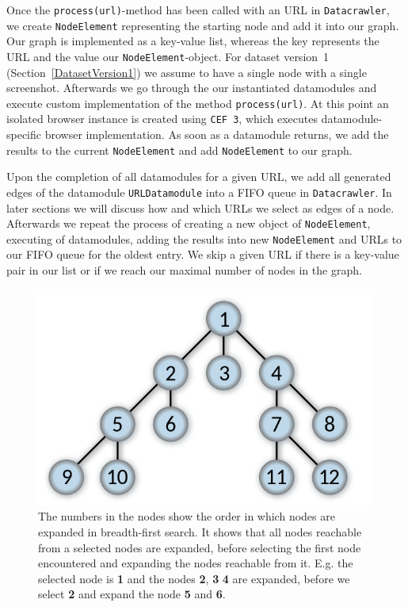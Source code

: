 Once the \texttt{process(url)}-method has been called with an URL in \texttt{Datacrawler}, we create \texttt{NodeElement} representing the starting node and add it into our graph. Our graph is implemented as a key-value list, whereas the key represents the URL and the value our \texttt{NodeElement}-object. For dataset version~1 (Section~\ref{DatasetVersion1}) we assume to have a single node with a single screenshot. Afterwards we go through the our instantiated datamodules and execute custom implementation of the method \texttt{process(url)}. At this point an isolated browser instance is created using \texttt{CEF 3}, which executes datamodule-specific browser implementation. As soon as a datamodule returns, we add the results to the current \texttt{NodeElement} and add \texttt{NodeElement} to our graph. 

Upon the completion of all datamodules for a given URL, we add all generated edges of the datamodule \texttt{URLDatamodule} into a FIFO queue in \texttt{Datacrawler}. In later sections we will discuss how and which URLs we select as edges of a node. Afterwards we repeat the process of creating a new object of \texttt{NodeElement}, executing of datamodules, adding the results into new \texttt{NodeElement} and URLs to our FIFO queue for the oldest entry. We skip a given URL if there is a key-value pair in our list or if we reach our maximal number of nodes in the graph.

\begin{figure}
	\centering
	\includegraphics[scale=0.35]{resources/breadth-first}
	\caption[Illustration of the breadth-first search algorithm]{ The numbers in the nodes show the order in which nodes are expanded in breadth-first search. It shows that all nodes reachable from a selected nodes are expanded, before selecting the first node encountered and expanding the nodes reachable from it. E.g. the selected node is \textbf{1} and the nodes \textbf{2}, \textbf{3} \textbf{4} are expanded, before we select \textbf{2} and expand the node \textbf{5} and \textbf{6}.}
	\label{datacrawler_breadth_search}
\end{figure}

